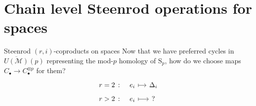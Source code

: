 \documentclass[10pt,t, handout]{beamer} %
\renewcommand{\S}{\mathrm{S}}
\newcommand{\M}{\overline{U(\mathcal M)}}
\begin{document}
\section{Chain level Steenrod operations for spaces}

\begin{frame}[fragile]{Steenrod $(r,i)$-coproducts on spaces}
	Now that we have preferred cycles in $\M(p)$ representing the mod-$p$ homology of $\S_p$, how do we choose maps $C_\bullet \to C_\bullet^{\otimes p}$ for them?
	\begin{equation*}
	\begin{tikzcd}[column sep=small, row sep=tiny]
	r = 2 \ \colon &[-10pt] e_i \arrow[r, |->] & \Delta_i \\
	r > 2 \ \colon & e_i \arrow[r, |->] & ?
	\end{tikzcd}
	\end{equation*}
	
	\pause
	

\end{frame}
\end{document}
